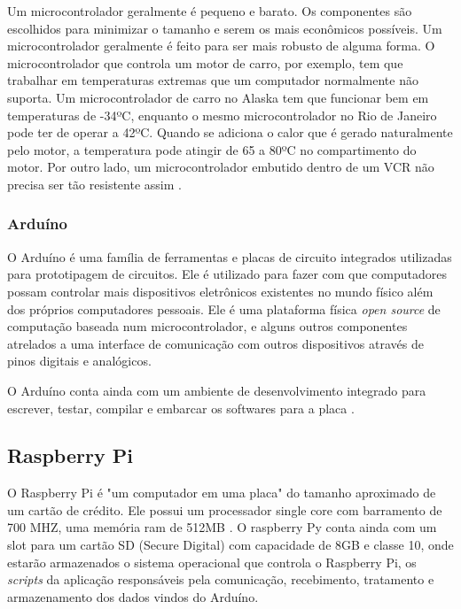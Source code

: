 \documentclass[final,12pt, times, 5p, twocolumn]{elsarticle}
\begin{document}
Um microcontrolador geralmente é pequeno e barato\cite{marshallbrainmicrocontrolador}. Os componentes são escolhidos para minimizar o tamanho e serem os mais econômicos possíveis. Um microcontrolador geralmente é feito para ser mais robusto de alguma forma. O microcontrolador que controla um motor de carro, por exemplo, tem que trabalhar em temperaturas extremas que um computador normalmente não suporta. Um microcontrolador de carro no Alaska tem que funcionar bem em temperaturas de -34ºC, enquanto o mesmo microcontrolador no Rio de Janeiro pode ter de operar a 42ºC. Quando se adiciona o calor que é gerado naturalmente pelo motor, a temperatura pode atingir de 65 a 80ºC no compartimento do motor. Por outro lado, um microcontrolador embutido dentro de um VCR não precisa ser tão resistente assim \cite{marshallbrainmicrocontrolador}.

\subsubsection{Arduíno}

O Arduíno \cite{Arduino} é uma família de ferramentas e placas de circuito integrados utilizadas para prototipagem de circuitos. Ele é utilizado para fazer com que computadores possam controlar mais dispositivos eletrônicos existentes no mundo físico além dos próprios computadores pessoais. Ele é uma plataforma física \textit{open source} de computação baseada num microcontrolador, e alguns outros componentes atrelados a uma interface de comunicação com outros dispositivos através de pinos digitais e analógicos. 

O Arduíno conta ainda com um ambiente de desenvolvimento integrado para escrever, testar, compilar e embarcar os softwares para a placa \cite{arduinoworkshop}.

\subsection{Raspberry Pi}

O Raspberry Pi é "um computador em uma placa" do tamanho aproximado de um cartão de crédito. Ele possui um processador single core com barramento de 700 MHZ, uma memória ram de 512MB \cite{programandoraspberrypi}. O raspberry Py conta ainda com um slot para um cartão SD (Secure Digital) com capacidade de 8GB e classe 10, onde estarão armazenados o sistema operacional que controla o Raspberry Pi, os \textit{scripts} da aplicação responsáveis pela comunicação, recebimento, tratamento e armazenamento dos dados vindos do Arduíno.
\end{document}
